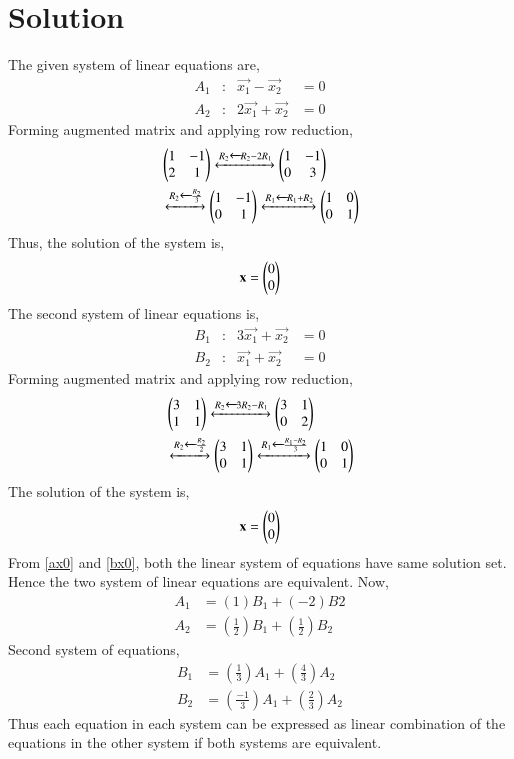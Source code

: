 \documentclass[journal,12pt,twocolumn]{IEEEtran}
\begin{document}
\section{Solution}
The given system of linear equations are, 
\begin{align}
    A_1 &: & \vec{x_1}-\vec{x_2}&=0 \label{a1}\\
    A_2 &: & 2\vec{x_1}+\vec{x_2}&=0 \label{a2}
\end{align}
Forming augmented matrix and applying row reduction, 
\begin{align}
    &\begin{pmatrix}1 & -1 \\ 2 & 1\end{pmatrix} \xleftrightarrow{R_2\xleftarrow{}R_2-2R_1} \begin{pmatrix}1 & -1 \\ 0 & 3\end{pmatrix} \\
    &\xleftrightarrow{R_2\xleftarrow{}\frac{R_2}{3}} \begin{pmatrix}1 & -1 \\ 0 & 1\end{pmatrix} \xleftrightarrow{R_1\xleftarrow{}R_1+R_2} \begin{pmatrix}1 & 0 \\ 0 & 1\end{pmatrix} \\
\end{align}
Thus, the solution of the system is, 
\begin{align}
    \mathbf{x}= \begin{pmatrix}0\\0\end{pmatrix} \label{ax0}
\end{align}
The second system of linear equations is, 
\begin{align}
    B_1 &: & 3\vec{x_1}+\vec{x_2}&=0 \label{a1}\\
    B_2 &: & \vec{x_1}+\vec{x_2}&=0 \label{a2}
\end{align}
Forming augmented matrix and applying row reduction, 
\begin{align}
    &\begin{pmatrix}3 & 1 \\ 1 & 1\end{pmatrix} \xleftrightarrow{R_2\xleftarrow{}3R_2-R_1} \begin{pmatrix}3 & 1\\ 0 & 2\end{pmatrix} \\
    &\xleftrightarrow{R_2\xleftarrow{}\frac{R_2}{2}}\begin{pmatrix}3 & 1\\ 0 & 1\end{pmatrix}\xleftrightarrow{R_1\xleftarrow{}\frac{R_1-R_2}{3}} \begin{pmatrix}1 & 0\\ 0 & 1\end{pmatrix}
\end{align}
The solution of the system is, 
\begin{align}
    \mathbf{x}= \begin{pmatrix}0\\0\end{pmatrix} \label{bx0}
\end{align}
From \eqref{ax0} and \eqref{bx0}, both the linear system of equations have same solution set. Hence the two system of linear equations are equivalent. 
Now, 
\begin{align}
    A_1 &= (1)B_1 + (-2)B2 \\
    A_2 &= (\frac{1}{2})B_1 + (\frac{1}{2})B_2
\end{align}
Second system of equations, 
\begin{align}
    B_1 &= (\frac{1}{3})A_1 + (\frac{4}{3})A_2 \\
    B_2 &= (\frac{-1}{3})A_1 + (\frac{2}{3})A_2
\end{align}
Thus each equation in each system can be expressed as linear combination of the equations in the other system if both systems are equivalent. 
\end{document}
